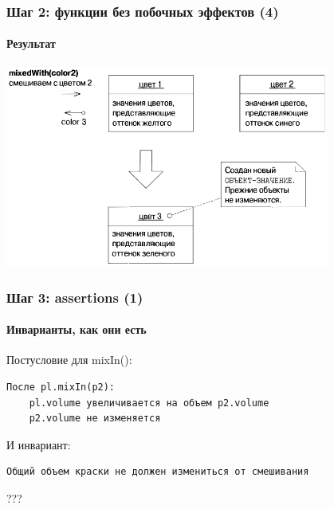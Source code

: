 \documentclass[xetex,mathserif,serif]{beamer}
\begin{document}
	\begin{frame}
		\frametitle{Шаг 2: функции без побочных эффектов (4)}
		\framesubtitle{Результат}
		\begin{center}
			\includegraphics[width=0.8\textwidth]{pigmentColorValueObject.png}
		\end{center}
	\end{frame}

	\begin{frame}[fragile]
		\frametitle{Шаг 3: assertions (1)}
		\framesubtitle{Инварианты, как они есть}
		Постусловие для mixIn():
		{\color{blue}
		\begin{verbatim}
После pl.mixIn(p2):
    pl.volume увеличивается на объем p2.volume
    p2.volume не изменяется
\end{verbatim} }
		И инвариант:
		{\color{blue}
		\begin{verbatim}
Общий объем краски не должен измениться от смешивания
\end{verbatim} }
	???
\end{frame}
\end{document}
